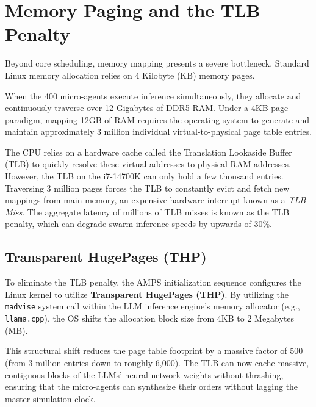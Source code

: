 \section{Memory Paging and the TLB Penalty}

Beyond core scheduling, memory mapping presents a severe bottleneck. Standard Linux memory allocation relies on 4 Kilobyte (KB) memory pages. 

When the 400 micro-agents execute inference simultaneously, they allocate and continuously traverse over 12 Gigabytes of DDR5 RAM. Under a 4KB page paradigm, mapping 12GB of RAM requires the operating system to generate and maintain approximately 3 million individual virtual-to-physical page table entries. 

The CPU relies on a hardware cache called the Translation Lookaside Buffer (TLB) to quickly resolve these virtual addresses to physical RAM addresses. However, the TLB on the i7-14700K can only hold a few thousand entries. Traversing 3 million pages forces the TLB to constantly evict and fetch new mappings from main memory, an expensive hardware interrupt known as a \textit{TLB Miss}. The aggregate latency of millions of TLB misses is known as the TLB penalty, which can degrade swarm inference speeds by upwards of 30\%.

\subsection{Transparent HugePages (THP)}

To eliminate the TLB penalty, the AMPS initialization sequence configures the Linux kernel to utilize \textbf{Transparent HugePages (THP)}. By utilizing the \texttt{madvise} system call within the LLM inference engine's memory allocator (e.g., \texttt{llama.cpp}), the OS shifts the allocation block size from 4KB to 2 Megabytes (MB).

This structural shift reduces the page table footprint by a massive factor of 500 (from 3 million entries down to roughly 6,000). The TLB can now cache massive, contiguous blocks of the LLMs' neural network weights without thrashing, ensuring that the micro-agents can synthesize their orders without lagging the master simulation clock.

